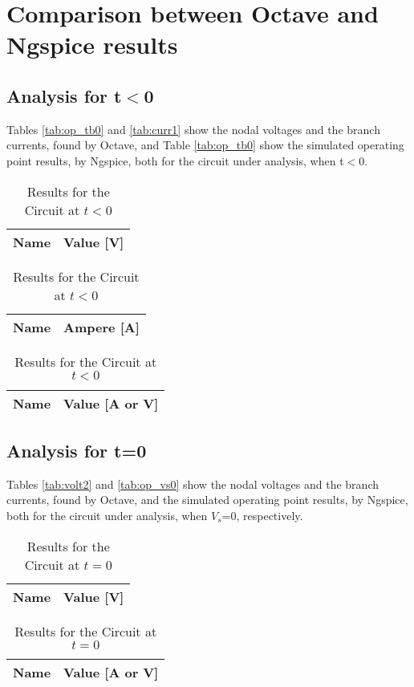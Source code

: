 \section{Comparison between Octave and Ngspice results}
\label{sec:comparison}

\subsection{Analysis for t$<$0}

\par Tables \ref{tab:op_tb0} and \ref{tab:curr1} show the nodal voltages and the branch
currents, found by Octave, and Table \ref{tab:op_tb0} show the simulated operating point
results, by Ngspice, both for the circuit under analysis, when t$<$0.

\begin{table}[htb!]
  \centering
  \begin{tabular}{|l|r|}
      \hline    
      {\bf Name} & {\bf Value [V]} \\ \hline
      
  \end{tabular}
\quad
  \begin{tabular}{|l|r|}
    \hline    
    {\bf Name} & {\bf Ampere [A]} \\ \hline
    
  \end{tabular}
\quad
  \begin{tabular}{|l|r|}
    \hline    
    {\bf Name} & {\bf Value [A or V]} \\ \hline
    
  \end{tabular}
  \caption{Results for the Circuit at $t<0$}
\end{table}

\newpage
\subsection{Analysis for t=0}

\par Tables \ref{tab:volt2} and \ref{tab:op_vs0} show the nodal voltages and the branch
currents, found by Octave, and the simulated operating point results, by Ngspice, both 
for the circuit under analysis, when $V_s$=0, respectively.

\begin{table}[htb!]
  \centering
  \begin{tabular}{|l|r|}
      \hline    
      {\bf Name} & {\bf Value [V]} \\ \hline
      
  \end{tabular}
\quad
  \begin{tabular}{|l|r|}
    \hline    
    {\bf Name} & {\bf Value [A or V]} \\ \hline
    
  \end{tabular}
  \caption{Results for the Circuit at $t=0$}
\end{table}




